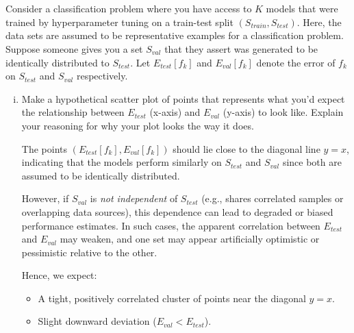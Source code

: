 \documentclass[a4paper]{article}
\begin{document}
\section{}
Consider a classification problem where you have access to $K$ models that were trained by hyperparameter tuning on a train-test split $(S_\mathit{train} , S_\mathit{test})$.
Here, the data sets are assumed to be representative examples for a classification problem.
Suppose someone gives you a set $S_\mathit{val}$ that they assert was generated to be identically distributed to $S_\mathit{test}$.
Let $E_\mathit{test} [f_k]$ and $E_\mathit{val} [f_k]$ denote the error of $f_k$ on $S_\mathit{test}$ and $S_\mathit{val}$ respectively.
\begin{enumerate}[(i)]
    \item Make a hypothetical scatter plot of points that represents what you’d expect the relationship between $E_\mathit{test}$ (x-axis) and $E_\mathit{val}$ (y-axis) to look like.
        Explain your reasoning for why your plot looks the way it does.

The points $(E_\mathit{test}[f_k], E_\mathit{val}[f_k])$ should lie close to the diagonal line $y = x$, indicating that the models perform similarly on $S_\mathit{test}$ and $S_\mathit{val}$ since both are assumed to be identically distributed.

However, if $S_\mathit{val}$ is \emph{not independent} of $S_\mathit{test}$ (e.g., shares correlated samples or overlapping data sources), this dependence can lead to degraded or biased performance estimates. In such cases, the apparent correlation between $E_\mathit{test}$ and $E_\mathit{val}$ may weaken, and one set may appear artificially optimistic or pessimistic relative to the other.

Hence, we expect:
\begin{itemize}
    \item A tight, positively correlated cluster of points near the diagonal $y = x$.
    \item Slight downward deviation ($E_\mathit{val} < E_\mathit{test}$).
\end{itemize}

\end{enumerate}
\end{document}

